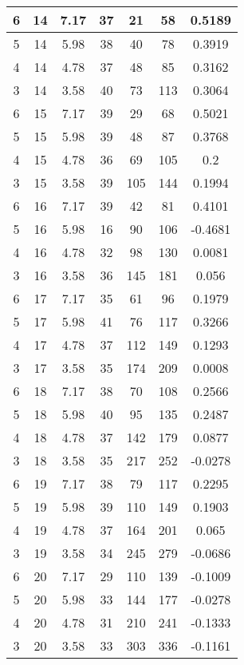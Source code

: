 \documentclass[letterpaper, 12pt]{article}
\begin{document}
\begin{longtable}{|c|c|c|c|c|c|c|}
\hline
6 & 14 & 7.17 & 37 & 21 & 58 & 0.5189 \\
\hline
5 & 14 & 5.98 & 38 & 40 & 78 & 0.3919 \\
\hline
4 & 14 & 4.78 & 37 & 48 & 85 & 0.3162 \\
\hline
3 & 14 & 3.58 & 40 & 73 & 113 & 0.3064 \\
\hline
6 & 15 & 7.17 & 39 & 29 & 68 & 0.5021 \\
\hline
5 & 15 & 5.98 & 39 & 48 & 87 & 0.3768 \\
\hline
4 & 15 & 4.78 & 36 & 69 & 105 & 0.2 \\
\hline
3 & 15 & 3.58 & 39 & 105 & 144 & 0.1994 \\
\hline
6 & 16 & 7.17 & 39 & 42 & 81 & 0.4101 \\
\hline
5 & 16 & 5.98 & 16 & 90 & 106 & -0.4681 \\
\hline
4 & 16 & 4.78 & 32 & 98 & 130 & 0.0081 \\
\hline
3 & 16 & 3.58 & 36 & 145 & 181 & 0.056 \\
\hline
6 & 17 & 7.17 & 35 & 61 & 96 & 0.1979 \\
\hline
5 & 17 & 5.98 & 41 & 76 & 117 & 0.3266 \\
\hline
4 & 17 & 4.78 & 37 & 112 & 149 & 0.1293 \\
\hline
3 & 17 & 3.58 & 35 & 174 & 209 & 0.0008 \\
\hline
6 & 18 & 7.17 & 38 & 70 & 108 & 0.2566 \\
\hline
5 & 18 & 5.98 & 40 & 95 & 135 & 0.2487 \\
\hline
4 & 18 & 4.78 & 37 & 142 & 179 & 0.0877 \\
\hline
3 & 18 & 3.58 & 35 & 217 & 252 & -0.0278 \\
\hline
6 & 19 & 7.17 & 38 & 79 & 117 & 0.2295 \\
\hline
5 & 19 & 5.98 & 39 & 110 & 149 & 0.1903 \\
\hline
4 & 19 & 4.78 & 37 & 164 & 201 & 0.065 \\
\hline
3 & 19 & 3.58 & 34 & 245 & 279 & -0.0686 \\
\hline
6 & 20 & 7.17 & 29 & 110 & 139 & -0.1009 \\
\hline
5 & 20 & 5.98 & 33 & 144 & 177 & -0.0278 \\
\hline
4 & 20 & 4.78 & 31 & 210 & 241 & -0.1333 \\
\hline
3 & 20 & 3.58 & 33 & 303 & 336 & -0.1161 \\
\hline
\end{longtable}
\end{document}
